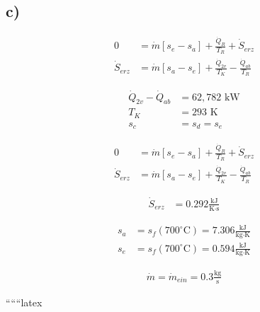 

\subsection*{c)}
\begin{align*}
0 &= \dot{m} \left[ s_e - s_a \right] + \frac{\dot{Q}_R}{T_R} + \dot{S}_{erz} \\
\dot{S}_{erz} &= \dot{m} \left[ s_a - s_e \right] + \frac{\dot{Q}_{2v}}{T_K} - \frac{\dot{Q}_{ab}}{T_R}
\end{align*}

\begin{align*}
\dot{Q}_{2v} - \dot{Q}_{ab} &= 62,782 \text{ kW} \\
T_K &= 293 \text{ K} \\
s_c &= s_d = s_e
\end{align*}

\begin{align*}
0 &= \dot{m} \left[ s_e - s_a \right] + \frac{\dot{Q}_R}{T_R} + \dot{S}_{erz} \\
\dot{S}_{erz} &= \dot{m} \left[ s_a - s_e \right] + \frac{\dot{Q}_{2v}}{T_K} - \frac{\dot{Q}_{ab}}{T_R}
\end{align*}

\begin{align*}
\dot{S}_{erz} &= 0.292 \frac{\text{kJ}}{\text{K} \cdot \text{s}}
\end{align*}

\begin{align*}
s_a &= s_f (700^\circ \text{C}) = 7.306 \frac{\text{kJ}}{\text{kg} \cdot \text{K}} \\
s_e &= s_f (700^\circ \text{C}) = 0.594 \frac{\text{kJ}}{\text{kg} \cdot \text{K}}
\end{align*}

\begin{align*}
\dot{m} = \dot{m}_{ein} = 0.3 \frac{\text{kg}}{\text{s}}
\end{align*}

``````latex